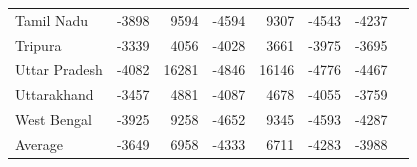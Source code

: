 \documentclass [12pt]{article}
\begin{document}
\begin{table}[htbp]
\begin{tabular}{lrrrrrrr}
    Tamil Nadu & -3898 & 9594 & -4594 & 9307 & -4543 & -4237 \\
    Tripura & -3339 & 4056 & -4028 & 3661 & -3975 & -3695 \\
    Uttar Pradesh & -4082 & 16281 & -4846 & 16146 & -4776 & -4467 \\
    Uttarakhand & -3457 & 4881 & -4087 & 4678 & -4055 & -3759 \\
    West Bengal & -3925 & 9258 & -4652 & 9345 & -4593 & -4287 \\
    \midrule
    Average & -3649 &  6958 & -4333 & 6711 & -4283 & -3988 \\
    \bottomrule
    \bottomrule
    \end{tabular}
\end{table}

\newpage
\restoregeometry
\printbibliography
\end{document}
